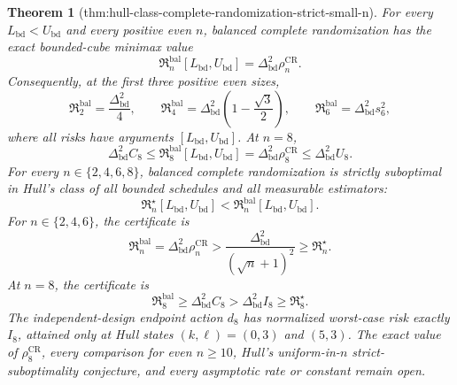 \documentclass{article}
\newtheorem{theorem}{Theorem}
\begin{document}
\begin{theorem}[thm:hull-class-complete-randomization-strict-small-n]\label{thm:hull-class-complete-randomization-strict-small-n}
For every \(L_{\mathrm{bd}}<U_{\mathrm{bd}}\) and every positive even \(n\), balanced complete randomization has the exact bounded-cube minimax value
\[
 \mathfrak R_n^{\mathrm{bal}}[L_{\mathrm{bd}},U_{\mathrm{bd}}]
 =\Delta_{\mathrm{bd}}^2\rho_n^{\mathrm{CR}}.
\]
Consequently, at the first three positive even sizes,
\[
 \mathfrak R_2^{\mathrm{bal}}=\frac{\Delta_{\mathrm{bd}}^2}{4},
 \qquad
 \mathfrak R_4^{\mathrm{bal}}
 =\Delta_{\mathrm{bd}}^2\left(1-\frac{\sqrt3}{2}\right),
 \qquad
 \mathfrak R_6^{\mathrm{bal}}=\Delta_{\mathrm{bd}}^2s_6^2,
\]
where all risks have arguments \([L_{\mathrm{bd}},U_{\mathrm{bd}}]\).  At \(n=8\),
\[
 \Delta_{\mathrm{bd}}^2C_8
 \leq\mathfrak R_8^{\mathrm{bal}}[L_{\mathrm{bd}},U_{\mathrm{bd}}]
 =\Delta_{\mathrm{bd}}^2\rho_8^{\mathrm{CR}}
 \leq\Delta_{\mathrm{bd}}^2U_8.
\]
For every \(n\in\{2,4,6,8\}\), balanced complete randomization is strictly suboptimal in Hull's class of all bounded schedules and all measurable estimators:
\[
 \mathfrak R_n^\star[L_{\mathrm{bd}},U_{\mathrm{bd}}]
 <\mathfrak R_n^{\mathrm{bal}}[L_{\mathrm{bd}},U_{\mathrm{bd}}].
\]
For \(n\in\{2,4,6\}\), the certificate is
\[
 \mathfrak R_n^{\mathrm{bal}}
 =\Delta_{\mathrm{bd}}^2\rho_n^{\mathrm{CR}}
 >\frac{\Delta_{\mathrm{bd}}^2}{(\sqrt n+1)^2}
 \geq\mathfrak R_n^\star.
\]
At \(n=8\), the certificate is
\[
 \mathfrak R_8^{\mathrm{bal}}
 \geq\Delta_{\mathrm{bd}}^2C_8
 >\Delta_{\mathrm{bd}}^2I_8
 \geq\mathfrak R_8^\star.
\]
The independent-design endpoint action \(d_8\) has normalized worst-case risk exactly \(I_8\), attained only at Hull states \((k,\ell)=(0,3)\) and \((5,3)\).  The exact value of \(\rho_8^{\mathrm{CR}}\), every comparison for even \(n\geq10\), Hull's uniform-in-\(n\) strict-suboptimality conjecture, and every asymptotic rate or constant remain open.
\end{theorem}
\end{document}
